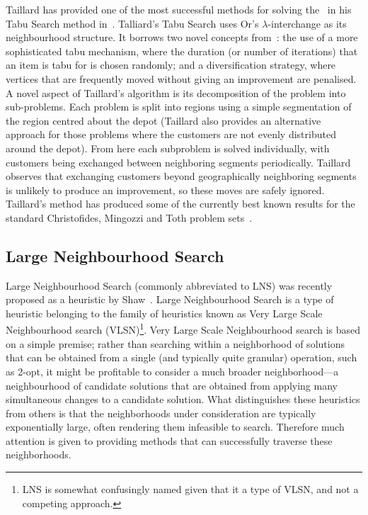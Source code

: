 Taillard has provided one of the most successful methods for solving the \VRP\ in his Tabu Search method in~\cite{Taillard:1993}. Talliard's Tabu Search uses Or's $\lambda$-interchange as its neighbourhood structure. It borrows two novel concepts from~\cite{GHL:1994}: the use of a more sophisticated tabu mechanism, where the duration (or number of iterations) that an item is tabu for is chosen randomly; and a diversification strategy, where vertices that are frequently moved without giving an improvement are penalised. A novel aspect of Taillard's algorithm is its decomposition of the problem into sub-problems. Each problem is split into regions using a simple segmentation of the region centred about the depot (Taillard also provides an alternative approach for those problems where the customers are not evenly distributed around the depot). From here each subproblem is solved individually, with customers being exchanged between neighboring segments periodically. Taillard observes that exchanging customers beyond geographically neighboring segments is unlikely to produce an improvement, so these moves are safely ignored. Taillard's method has produced some of the currently best known results for the standard Christofides, Mingozzi and Toth problem sets~\cite{CMT:1981}. 

\subsection{Large Neighbourhood Search}

Large Neighbourhood Search (commonly abbreviated to LNS) was recently proposed as a heuristic by Shaw~\cite{Shaw:1998}. Large Neighbourhood Search is a type of heuristic belonging to the family of heuristics known as Very Large Scale Neighbourhood search (VLSN)\footnote{LNS is somewhat confusingly named given that it a type of VLSN, and not a competing approach.}. Very Large Scale Neighbourhood search is based on a simple premise; rather than searching within a neighborhood of solutions that can be obtained from a single (and typically quite granular) operation, such as 2-opt, it might be profitable to consider a much broader neighborhood---a neighbourhood of candidate solutions that are obtained from applying many simultaneous changes to a candidate solution. What distinguishes these heuristics from others is that the neighborhoods under consideration are typically exponentially large, often rendering them infeasible to search. Therefore much attention is given to providing methods that can successfully traverse these neighborhoods. 


